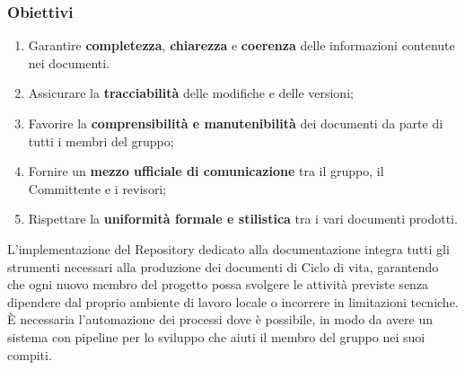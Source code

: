 \documentclass[a4paper,12pt]{article}
\begin{document}
\subsubsection{Obiettivi}
\begin{enumerate}
  \item Garantire \textbf{completezza}, \textbf{chiarezza} e \textbf{coerenza} delle informazioni contenute nei documenti.
  \item Assicurare la \textbf{tracciabilità} delle modifiche e delle versioni;
   \item Favorire la \textbf{comprensibilità e manutenibilità} dei documenti da parte di tutti i membri del gruppo;
   \item Fornire un \textbf{mezzo ufficiale di comunicazione} tra il gruppo, il Committente e i revisori;
   \item Rispettare la \textbf{uniformità formale e stilistica} tra i vari documenti prodotti.
\end{enumerate}
L’implementazione del Repository dedicato alla documentazione integra tutti gli strumenti necessari alla produzione dei documenti di Ciclo di vita, garantendo che ogni nuovo membro del progetto possa svolgere le attività previste senza dipendere dal proprio ambiente di lavoro locale o incorrere in limitazioni tecniche.\\È necessaria l'automazione dei processi dove è possibile, in modo da avere un sistema con pipeline per lo sviluppo che aiuti il membro del gruppo nei suoi compiti.
\end{document}
